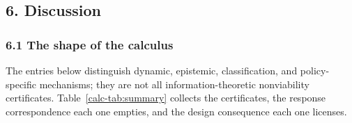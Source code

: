 \documentclass[10pt,twocolumn]{article}
\theoremstyle{definition}
\begin{document}
\subsection{6. Discussion}\label{calc-discussion}


\subsubsection{6.1 The shape of the
calculus}\label{calc-the-shape-of-the-calculus}

The entries below distinguish dynamic, epistemic, classification, and policy-specific mechanisms; they are not all information-theoretic nonviability certificates. Table~\ref{calc-tab:summary} collects the certificates, the response correspondence each one empties, and the design consequence each one licenses.
\end{document}
